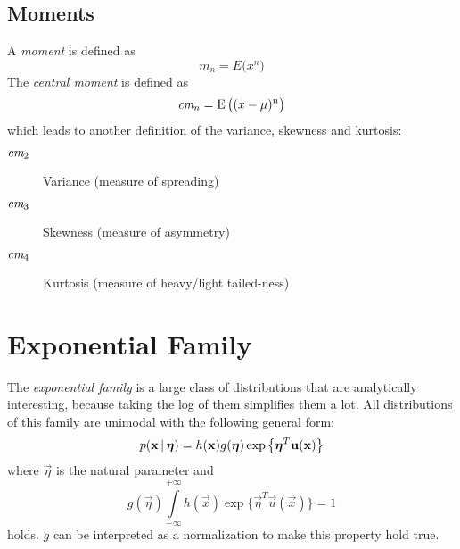 		\subsection{Moments}
			A \emph{moment} is defined as
			\begin{equation}
				m_n = E\big(x^n\big)
			\end{equation}
			The \emph{central moment} is defined as
			\begin{equation}
				\textit{cm}_n = \operatorname{E}\big( (x - \mu)^n \big)
			\end{equation}
			which leads to another definition of the variance, skewness and kurtosis:
			\begin{description}
				\item[\( \textit{\textrm{cm}}_2 \)] Variance (measure of spreading)
				\item[\( \textit{\textrm{cm}}_3 \)] Skewness (measure of asymmetry)
				\item[\( \textit{\textrm{cm}}_4 \)] Kurtosis (measure of heavy/light tailed-ness)
			\end{description}

	\section{Exponential Family}
		The \emph{exponential family} is a large class of distributions that are analytically interesting, because taking the log of them simplifies them a lot. All distributions of this family are unimodal with the following general form:
		\begin{equation}
			p(\boldsymbol{\mathrm{x}} \,\vert\, \boldsymbol{\mathrm{\eta}}) = h(\boldsymbol{\mathrm{x}}) g(\boldsymbol{\mathrm{\eta}}) \exp \big\{ \boldsymbol{\mathrm{\eta}}^T \boldsymbol{\mathrm{u}}(\boldsymbol{\mathrm{x}}) \big\}
		\end{equation}
		where \(\vec{\eta}\) is the natural parameter and
		\begin{equation}
			g(\vec{\eta}) \int\limits_{-\infty}^{+\infty} h(\vec{x}) \exp \big\{ \vec{\eta}^T \vec{u}(\vec{x}) \big\} = 1
		\end{equation}
		holds. \(g\) can be interpreted as a normalization to make this property hold true.

